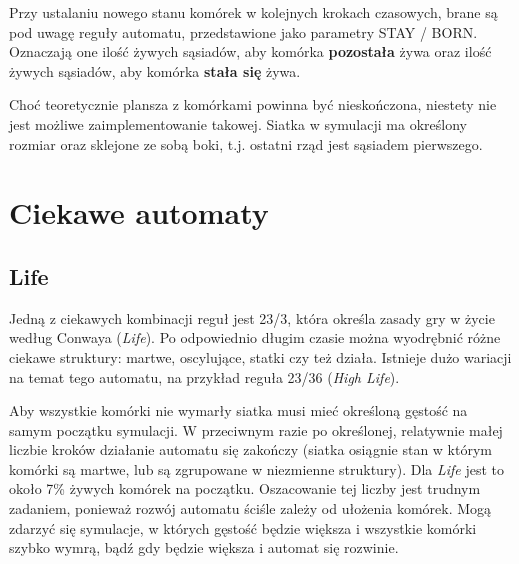 \documentclass[12pt]{article}
\begin{document}
Przy ustalaniu nowego stanu komórek w kolejnych krokach czasowych, brane są pod uwagę reguły automatu, przedstawione jako parametry STAY / BORN. Oznaczają one ilość żywych sąsiadów, aby komórka \textbf{pozostała} żywa oraz ilość żywych sąsiadów, aby komórka \textbf{stała się} żywa.

Choć teoretycznie plansza z komórkami powinna być nieskończona, niestety nie jest możliwe zaimplementowanie takowej. Siatka w symulacji ma określony rozmiar oraz sklejone ze sobą boki, t.j. ostatni rząd jest sąsiadem pierwszego.

\section{Ciekawe automaty}
\subsection{Life}
Jedną z ciekawych kombinacji reguł jest 23/3, która określa zasady gry w życie według Conwaya (\textit{Life}). Po odpowiednio długim czasie można wyodrębnić różne ciekawe struktury: martwe, oscylujące, statki czy też działa. Istnieje dużo wariacji na temat tego automatu, na przykład reguła 23/36 (\textit{High Life}).

Aby wszystkie komórki nie wymarły siatka musi mieć określoną gęstość na samym początku symulacji. W przeciwnym razie po określonej, relatywnie małej liczbie kroków działanie automatu się zakończy (siatka osiągnie stan w którym komórki są martwe, lub są zgrupowane w niezmienne struktury). Dla \textit{Life} jest to około 7\% żywych komórek na początku. Oszacowanie tej liczby jest trudnym zadaniem, ponieważ rozwój automatu ściśle zależy od ułożenia komórek. Mogą zdarzyć się symulacje, w których gęstość będzie większa i wszystkie komórki szybko wymrą, bądź gdy będzie większa i automat się rozwinie.
\end{document}

